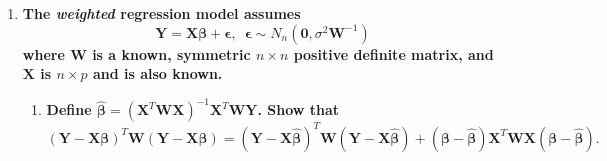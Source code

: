 \documentclass[11pt]{article}
\newenvironment{solution}
  {\renewcommand\qedsymbol{$\blacksquare$}\begin{proof}[Solution]}
  {\end{proof}}
\begin{document}
\begin{enumerate}
    \begin{solution}
    For families in the 90th percentile of income, we expect the proportionto be at or above the
    90th percentile of consumption to be  
    This follows from the fact that the relation of family income to consumption is positive and roughly linear, so
    we expect families with higher incomes to have higher levels of consumption.

    \end{solution}
   
	\newpage

    \item \textbf{The \textit{weighted} regression model assumes}
    \[
      \bm{Y} = \bm{X\beta} + \bm{\epsilon}, \, \, \, \bm{\epsilon} \sim N_n(\bm{0}, \sigma^{2}\bm{W}^{-1})
    \]
    \textbf{where $\bm{W}$ is a known, symmetric $n \times n$ positive definite matrix, and $\bm{X}$ is $n \times p$ and is also known.}

    \begin{enumerate}
      \item \textbf{Define $\hat{\bm{\beta}} = (\bm{X}^T \bm{WX})^{-1} \bm{X}^T \bm{WY}$. Show that}
      \[
        (\bm{Y} - \bm{X\beta})^T\bm{W}(\bm{Y} - \bm{X\beta}) = (\bm{Y} - \bm{X}\hat{\bm{\beta}})^T\bm{W}(\bm{Y} - \bm{X\hat{\bm{\beta}}}) + (\bm{\beta} - \hat{\bm{\beta}})\bm{X}^T\bm{WX}(\bm{\beta} - \hat{\bm{\beta}}).
      \]


\end{enumerate}
\end{enumerate}
\end{document}
